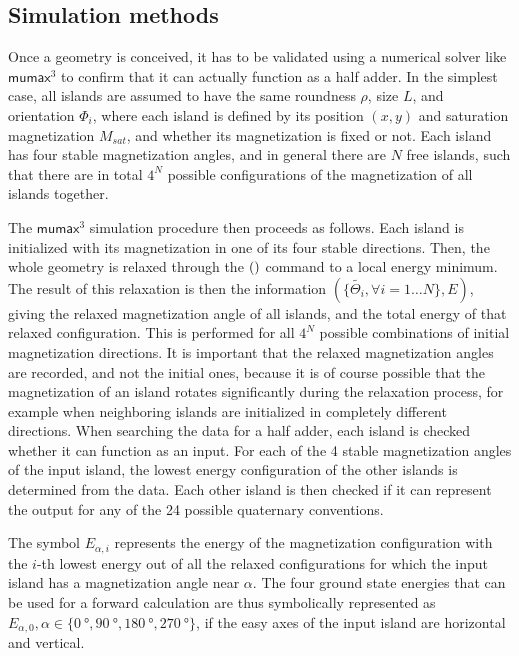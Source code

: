 \documentclass[11pt,a4paper,english]{article}
\newcommand{\mumax}{$\mathsf{mumax}^3$}
\begin{document}
\subsection{Simulation methods}
Once a geometry is conceived, it has to be validated using a numerical solver like \mumax{} to confirm that it can actually function as a half adder. In the simplest case, all islands are assumed to have the same roundness $\rho$, size $L$, and orientation $\Phi_i$, where each island is defined by its position $(x,y)$ and saturation magnetization $M_{sat}$, and whether its magnetization is fixed or not. Each island has four stable magnetization angles, and in general there are $N$ free islands, such that there are in total $4^N$ possible configurations of the magnetization of all islands together. \par
The \mumax{} simulation procedure then proceeds as follows. Each island is initialized with its magnetization in one of its four stable directions. Then, the whole geometry is relaxed through the $\relax()$ command to a local energy minimum. The result of this relaxation is then the information $(\{\widetilde{\Theta_i}, \forall i=1\dots N\}, E)$, giving the relaxed magnetization angle of all islands, and the total energy of that relaxed configuration. This is performed for all $4^N$ possible combinations of initial magnetization directions. It is important that the relaxed magnetization angles are recorded, and not the initial ones, because it is of course possible that the magnetization of an island rotates significantly during the relaxation process, for example when neighboring islands are initialized in completely different directions. When searching the data for a half adder, each island is checked whether it can function as an input. For each of the 4 stable magnetization angles of the input island, the lowest energy configuration of the other islands is determined from the data. Each other island is then checked if it can represent the output for any of the 24 possible quaternary conventions. \par
The symbol $E_{\alpha,i}$ represents the energy of the magnetization configuration with the $i$-th lowest energy out of all the relaxed configurations for which the input island has a magnetization angle near $\alpha$. The four ground state energies that can be used for a forward calculation are thus symbolically represented as $E_{\alpha,0}, \alpha \in \{ \SI{0}{\degree}, \SI{90}{\degree}, \SI{180}{\degree}, \SI{270}{\degree} \}$, if the easy axes of the input island are horizontal and vertical.
\end{document}
